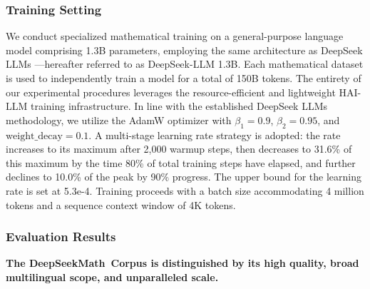\subsubsection{Training Setting}
\label{sec:quality-policy}
We conduct specialized mathematical training on a general-purpose language model comprising 1.3B parameters, employing the same architecture as DeepSeek LLMs \citep{deepseek-llm}—hereafter referred to as DeepSeek-LLM 1.3B. Each mathematical dataset is used to independently train a model for a total of 150B tokens. The entirety of our experimental procedures leverages the resource-efficient and lightweight HAI-LLM \citep{haillm} training infrastructure. In line with the established DeepSeek LLMs methodology, we utilize the AdamW optimizer \citep{adamW} with $\beta_1=0.9$, $\beta_2=0.95$, and $\mathrm{weight\_decay}=0.1$. A multi-stage learning rate strategy is adopted: the rate increases to its maximum after 2,000 warmup steps, then decreases to 31.6\% of this maximum by the time 80\% of total training steps have elapsed, and further declines to 10.0\% of the peak by 90\% progress. The upper bound for the learning rate is set at 5.3e-4. Training proceeds with a batch size accommodating 4 million tokens and a sequence context window of 4K tokens.

\subsubsection{Evaluation Results}

\textbf{The DeepSeekMath~Corpus is distinguished by its high quality, broad multilingual scope, and unparalleled scale.}

